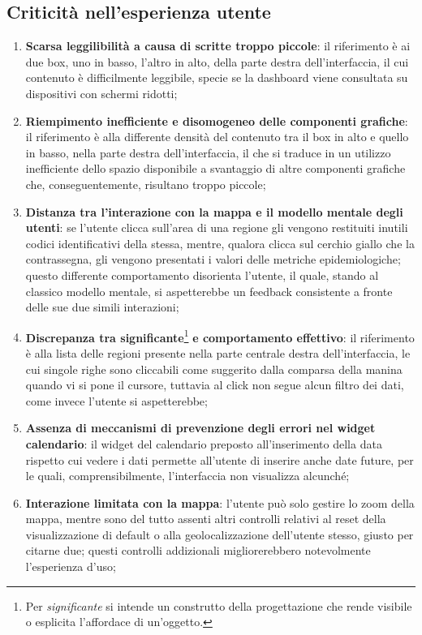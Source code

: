 \documentclass[../../main.tex]{subfiles}
\begin{document}
\subsection{Criticità nell'esperienza utente}\label{ss:criticita}
\begin{enumerate}
    \item \textbf{Scarsa leggilibilità a causa di scritte troppo piccole}: il riferimento è ai due box, uno in basso, l'altro in alto, della parte destra dell'interfaccia, il cui contenuto è difficilmente leggibile, specie se la dashboard viene consultata su dispositivi con schermi ridotti; \label{el:1}
    \item \textbf{Riempimento inefficiente e disomogeneo delle componenti grafiche}: il riferimento è alla differente densità del contenuto tra il box in alto e quello in basso, nella parte destra dell'interfaccia, il che si traduce in un utilizzo inefficiente dello spazio disponibile a svantaggio di altre componenti grafiche che, conseguentemente, risultano troppo piccole;\label{el:2}
    \item \textbf{Distanza tra l'interazione con la mappa e il modello mentale degli utenti}: se l'utente clicca sull'area di una regione gli vengono restituiti inutili codici identificativi della stessa, mentre, qualora clicca sul cerchio giallo che la contrassegna, gli vengono presentati i valori delle metriche epidemiologiche; questo differente comportamento disorienta l'utente, il quale, stando al classico modello mentale, si aspetterebbe un feedback consistente a fronte delle sue due simili interazioni;\label{el:3}
    \item \textbf{Discrepanza tra significante}\footnote{Per \textit{significante} si intende un construtto della progettazione che rende visibile o esplicita l'affordace di un'oggetto.}  \textbf{e comportamento effettivo}: il riferimento è alla lista delle regioni presente nella parte centrale destra dell'interfaccia, le cui singole righe sono cliccabili come suggerito dalla comparsa della manina quando vi si pone il cursore, tuttavia al click non segue alcun filtro dei dati, come invece l'utente si aspetterebbe;\label{el:4}
    \item \textbf{Assenza di meccanismi di prevenzione degli errori nel widget calendario}: il widget del calendario preposto all'inserimento della data rispetto cui vedere i dati permette all'utente di inserire anche date future, per le quali, comprensibilmente, l'interfaccia non visualizza alcunché;\label{el:5}
    \item \textbf{Interazione limitata con la mappa}: l'utente può solo gestire lo zoom della mappa, mentre sono del tutto assenti altri controlli relativi al reset della visualizzazione di default o alla geolocalizzazione dell'utente stesso, giusto per citarne due; questi controlli addizionali migliorerebbero notevolmente l'esperienza d'uso;\label{el:6}

\end{enumerate}
\end{document}
